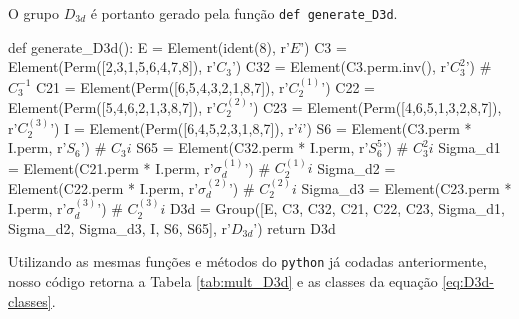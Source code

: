 \documentclass[a4paper,10pt]{article}
\newcommand{\python}[1]{\texttt{#1}}
\begin{document}
O grupo $D_{3d}$ é portanto gerado pela função \python{def generate_D3d}.
\begin{Python}
def generate_D3d():
    E = Element(ident(8), r'$E$')
    C3 = Element(Perm([2,3,1,5,6,4,7,8]), r'$C_3$')
    C32 = Element(C3.perm.inv(), r'$C_3^2$')                    # $C_3^{-1}$
    C21 = Element(Perm([6,5,4,3,2,1,8,7]), r'$C_2^{(1)}$')
    C22 = Element(Perm([5,4,6,2,1,3,8,7]), r'$C_2^{(2)}$')
    C23 = Element(Perm([4,6,5,1,3,2,8,7]), r'$C_2^{(3)}$')
    I = Element(Perm([6,4,5,2,3,1,8,7]), r'$i$')
    S6 = Element(C3.perm * I.perm, r'$S_6$')                    # $C_3 i$
    S65 = Element(C32.perm * I.perm, r'$S_6^5$')                # $C_3^2 i$
    Sigma_d1 = Element(C21.perm * I.perm, r'$\sigma_d^{(1)}$')  # $C_2^{(1)} i$
    Sigma_d2 = Element(C22.perm * I.perm, r'$\sigma_d^{(2)}$')  # $C_2^{(2)} i$
    Sigma_d3 = Element(C23.perm * I.perm, r'$\sigma_d^{(3)}$')  # $C_2^{(3)} i$
    D3d = Group([E, C3, C32, C21, C22, C23,
                 Sigma_d1, Sigma_d2, Sigma_d3, I, S6, S65], r'$D_{3d}$')
    return D3d
\end{Python}

Utilizando as mesmas funções e métodos do \python{python} já codadas anteriormente, nosso código retorna a Tabela \ref{tab:mult_D3d} e as classes da equação \ref{eq:D3d-classes}.
\end{document}
